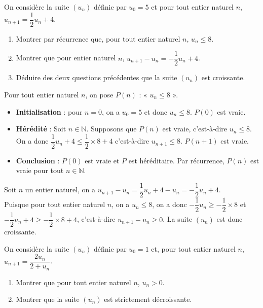 \documentclass[11pt,fleqn]{book} %
\begin{document}
\begin{exercise}
On considère la suite $(u_n)$ définie par $u_0=5$ et pour tout entier naturel $n$, $u_{n+1}=\dfrac{1}{2}u_n+4$.
\begin{enumerate}
\item Montrer par récurrence que, pour tout entier naturel $n$, $u_n \leqslant 8$.
\item Montrer que pour entier naturel $n$, $u_{n+1}-u_n = -\dfrac{1}{2}u_n+4$.
\item Déduire des deux questions précédentes que la suite $(u_n)$ est croissante.
\end{enumerate}\end{exercise}
\begin{solution}
Pour tout entier naturel $n$, on pose $P(n)$ : « $u_n \leqslant 8$ ».

\begin{itemize}
\item \textbf{Initialisation} : pour $n=0$, on a $u_0=5$ et donc $u_n \leqslant 8$. $P(0)$ est vraie.
\item \textbf{Hérédité} : Soit $n\in\mathbb{N}$. Supposons que $P(n)$ est vraie, c'est-à-dire $u_n \leqslant 8$. \\On a donc $\dfrac{1}{2}u_n+4 \leqslant \dfrac{1}{2}\times 8 +4$ c'est-à-dire $u_{n+1} \leqslant 8$. $P(n+1)$ est vraie.
\item \textbf{Conclusion} : $P(0)$ est vraie et $P$ est héréditaire. Par récurrence, $P(n)$ est vraie pour tout $n\in\mathbb{N}$.
\end{itemize}
Soit $n$ un entier naturel, on a $u_{n+1}-u_n = \dfrac{1}{2}u_n+4-u_n = -\dfrac{1}{2}u_n+4$.\\
Puisque pour tout entier naturel $n$, on a $u_n \leqslant 8$, on a donc $-\dfrac{1}{2}u_n \geqslant -\dfrac{1}{2} \times 8$ et $-\dfrac{1}{2}u_n+4 \geqslant -\dfrac{1}{2}\times 8 +4$, c'est-à-dire $u_{n+1}-u_n \geqslant 0$. La suite $(u_n)$ est donc croissante.\end{solution}

\begin{exercise}
On considère la suite \((u_n)\) définie par \(u_0=1\) et, pour tout entier naturel \(n\), \(u_{n+1}=\dfrac{2u_n}{2+u_n}\).
\begin{enumerate}
\item Montrer que pour tout entier naturel \(n\), \(u_n > 0\).
\item Montrer que la suite \((u_n)\) est strictement décroissante.
\end{enumerate}\end{exercise}
\end{document}
